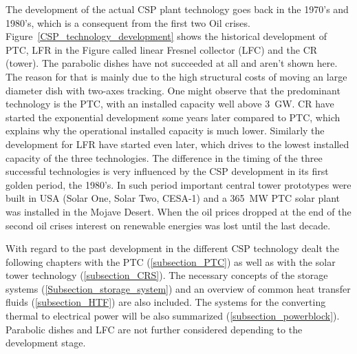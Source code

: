 The development of the actual CSP plant technology goes back in the 1970's and 1980's, which is a consequent from the first two Oil crises. Figure~\ref{CSP_technology_development} shows the historical development of PTC, LFR in the Figure called linear Fresnel collector (LFC) and the CR (tower). The parabolic dishes have not succeeded at all and aren't shown here. The reason for that is mainly due to the high structural costs of moving an large diameter dish with two-axes tracking. One might observe that the predominant technology is the PTC, with an installed capacity well above 3~GW. CR have started the exponential development some years later compared to PTC, which explains why the operational installed capacity is much lower. Similarly the development for LFR have started even later, which drives to the lowest installed capacity of the three technologies. The difference in the timing of the three successful technologies is very influenced by the CSP development in its first golden period, the 1980's. In such period important central tower prototypes were built in USA (Solar One, Solar Two, CESA-1) and a 365~MW PTC solar plant was installed in the Mojave Desert. When the oil prices dropped at the end of the second oil crises interest on renewable energies was lost until the last decade. 



With regard to the past development in the different CSP technology dealt the following chapters with the PTC (\ref{subsection_PTC}) as well as with the solar tower technology (\ref{subsection_CRS}). The necessary concepts of the storage systems (\ref{Subsection_storage_system}) and an overview of common heat transfer fluids (\ref{subsection_HTF}) are also included. The systems for the converting thermal to electrical power will be also summarized (\ref{subsection_powerblock}).  Parabolic dishes and LFC are not further considered depending to the development stage.
\pagebreak
